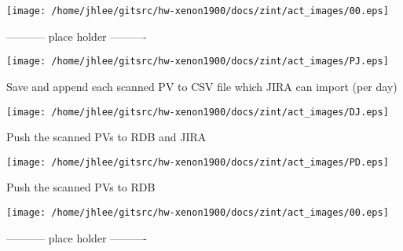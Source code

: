 \noindent
\vspace{1.4cm}
\begin{minipage}{.2\textwidth}
\begin{center}
\texttt{[image: /home/jhlee/gitsrc/hw-xenon1900/docs/zint/act\_images/00.eps]}
\end{center}
\end{minipage}
\begin{minipage}{.7\textwidth}
----------- place holder ----------
\end{minipage}


\noindent
\vspace{1.4cm}
\begin{minipage}{.2\textwidth}
\begin{center}
\texttt{[image: /home/jhlee/gitsrc/hw-xenon1900/docs/zint/act\_images/PJ.eps]}
\end{center}
\end{minipage}
\begin{minipage}{.7\textwidth}
Save and append each scanned PV to CSV file which JIRA can import  (per day)
\end{minipage}


\noindent
\vspace{1.4cm}
\begin{minipage}{.2\textwidth}
\begin{center}
\texttt{[image: /home/jhlee/gitsrc/hw-xenon1900/docs/zint/act\_images/DJ.eps]}
\end{center}
\end{minipage}
\begin{minipage}{.7\textwidth}
Push the scanned PVs to RDB and JIRA
\end{minipage}


\noindent
\vspace{1.4cm}
\begin{minipage}{.2\textwidth}
\begin{center}
\texttt{[image: /home/jhlee/gitsrc/hw-xenon1900/docs/zint/act\_images/PD.eps]}
\end{center}
\end{minipage}
\begin{minipage}{.7\textwidth}
Push the scanned PVs to RDB
\end{minipage}


\noindent
\vspace{1.4cm}
\begin{minipage}{.2\textwidth}
\begin{center}
\texttt{[image: /home/jhlee/gitsrc/hw-xenon1900/docs/zint/act\_images/00.eps]}
\end{center}
\end{minipage}
\begin{minipage}{.7\textwidth}
----------- place holder ----------
\end{minipage}


